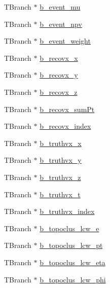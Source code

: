 \begin{DoxyCompactItemize}
T\+Branch $\ast$ \hyperlink{classCollectionTree_a0830bd527470b87177441a2cb69ac348}{b\+\_\+event\+\_\+mu}
\item 
T\+Branch $\ast$ \hyperlink{classCollectionTree_a221d8f95fdd2b4ff2559dde18969e64c}{b\+\_\+event\+\_\+npv}
\item 
T\+Branch $\ast$ \hyperlink{classCollectionTree_a2de8627b46da1a3c1a4012298e184df0}{b\+\_\+event\+\_\+weight}
\item 
T\+Branch $\ast$ \hyperlink{classCollectionTree_a5fe37c4e24b3fba36be8c95c446ea46c}{b\+\_\+recovx\+\_\+x}
\item 
T\+Branch $\ast$ \hyperlink{classCollectionTree_a0f1924d717ebe0ef601a4adf943953da}{b\+\_\+recovx\+\_\+y}
\item 
T\+Branch $\ast$ \hyperlink{classCollectionTree_aebfca6854a5b826b3e05f25c0469c3b0}{b\+\_\+recovx\+\_\+z}
\item 
T\+Branch $\ast$ \hyperlink{classCollectionTree_aafe003458414f86cfebfd65e9613e77e}{b\+\_\+recovx\+\_\+sum\+Pt}
\item 
T\+Branch $\ast$ \hyperlink{classCollectionTree_a2d5ed2bf250f5af107197669ec469bcd}{b\+\_\+recovx\+\_\+index}
\item 
T\+Branch $\ast$ \hyperlink{classCollectionTree_a048b05d61ec1acf0484b7106a03f16fe}{b\+\_\+truthvx\+\_\+x}
\item 
T\+Branch $\ast$ \hyperlink{classCollectionTree_a8a72e1ca3889a4b483bee297f85168f3}{b\+\_\+truthvx\+\_\+y}
\item 
T\+Branch $\ast$ \hyperlink{classCollectionTree_ad0754190b6fdf2397af1e4e18334866f}{b\+\_\+truthvx\+\_\+z}
\item 
T\+Branch $\ast$ \hyperlink{classCollectionTree_a8374d7f77260f07800ee31a7497c71b1}{b\+\_\+truthvx\+\_\+t}
\item 
T\+Branch $\ast$ \hyperlink{classCollectionTree_a6df556b379c9886a68ef8e603244c7be}{b\+\_\+truthvx\+\_\+index}
\item 
T\+Branch $\ast$ \hyperlink{classCollectionTree_a96eade46945d6fad68d034ff2ec3a11f}{b\+\_\+topoclus\+\_\+lcw\+\_\+e}
\item 
T\+Branch $\ast$ \hyperlink{classCollectionTree_a7a48582f6a79ff872cffeca9cb948ea2}{b\+\_\+topoclus\+\_\+lcw\+\_\+pt}
\item 
T\+Branch $\ast$ \hyperlink{classCollectionTree_ad46149cc5532282d122576587789d4b6}{b\+\_\+topoclus\+\_\+lcw\+\_\+eta}
\item 
T\+Branch $\ast$ \hyperlink{classCollectionTree_a86c19f6f92179a68f2530ac3a6d6416d}{b\+\_\+topoclus\+\_\+lcw\+\_\+phi}

\end{DoxyCompactItemize}
